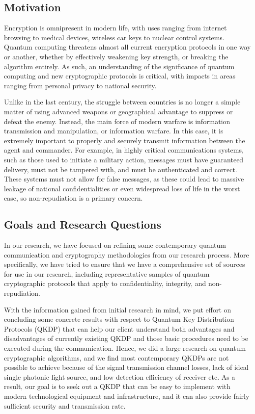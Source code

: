 \documentclass[sigconf]{acmart}
\begin{document}
\subsection{Motivation}
Encryption is omnipresent in modern life, with uses ranging from internet browsing to medical devices, wireless car keys to nuclear control systems. Quantum computing threatens almost all current encryption protocols in one way or another, whether by effectively weakening key strength, or breaking the algorithm entirely. As such, an understanding of the significance of quantum computing and new cryptographic protocols is critical, with impacts in areas ranging from personal privacy to national security.

Unlike in the last century, the struggle between countries is no longer a simple matter of using advanced weapons or geographical advantage to suppress or defeat the enemy. Instead, the main force of modern warfare is information transmission and manipulation, or information warfare.
In this case, it is extremely important to properly and securely transmit information between the agent and commander. For example, in highly critical communications systems, such as those used to initiate a military action, messages must have guaranteed delivery, must not be tampered with, and must be authenticated and correct. These systems must not allow for false messages, as these could lead to massive leakage of national confidentialities or even widespread loss of life in the worst case, so non-repudiation is a primary concern.
 
\subsection{Goals and Research Questions}
In our research, we have focused on refining some contemporary quantum communication and cryptography methodologies from our research process. More specifically, we have tried to ensure that we have a comprehensive set of sources for use in our research, including representative samples of quantum cryptographic protocols that apply to confidentiality, integrity, and non-repudiation.

With the information gained from initial research in mind, we put effort on concluding some concrete results with respect to Quantum Key Distribution Protocols (QKDP) that can help our client understand both advantages and disadvantages of currently existing QKDP and those basic procedures need to be executed during the communication. Hence, we did a large research on quantum cryptographic algorithms, and we find most contemporary QKDPs are not possible to achieve because of the signal transmission channel losses, lack of ideal single photonic light source, and low detection efficiency of receiver etc. As a result, our goal is to seek out a QKDP that can be easy to implement with modern technological equipment and infrastructure, and it can also provide fairly sufficient security and transmission rate. 
\end{document}
